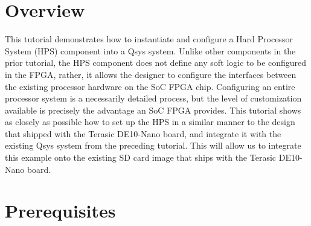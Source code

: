 \tableofcontents

\section*{Overview}

\begin{flushleft}
\noindent
This tutorial demonstrates how to instantiate and configure a Hard Processor System (HPS) component into a Qsys system.  Unlike other components in the prior  tutorial, the HPS component does not define any soft logic to be configured in the FPGA, rather, it allows the designer to configure the interfaces between the existing processor hardware on the SoC FPGA chip.  Configuring an entire processor system is a necessarily detailed process, but the level of customization available is precisely the advantage an SoC FPGA provides.  This tutorial shows as closely as possible how to set up the HPS in a similar manner to the design that shipped with the Terasic DE10-Nano board, and integrate it with the existing Qsys system from the preceding  tutorial.  This will allow us to integrate this example onto the existing SD card image that ships with the Terasic DE10-Nano board.

\end{flushleft}

\section*{Prerequisites}

